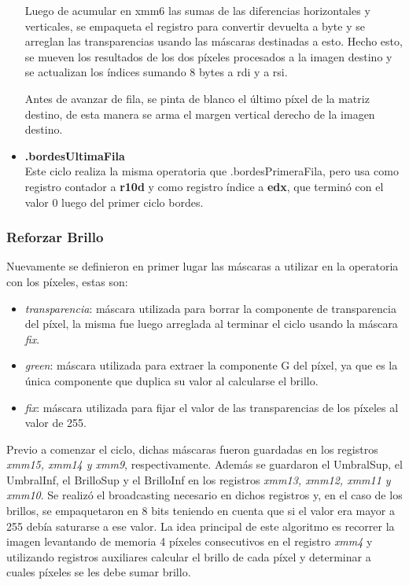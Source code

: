 \documentclass[a4paper]{article}
\begin{document}
\begin{itemize}
	Luego de acumular en xmm6 las sumas de las diferencias horizontales y verticales, se empaqueta el registro para convertir devuelta a byte y se arreglan las transparencias usando las máscaras destinadas a esto. Hecho esto, se mueven los resultados de los dos píxeles procesados a la imagen destino y se actualizan los índices sumando 8 bytes a rdi y a rsi.
	
	Antes de avanzar de fila, se pinta de blanco el último píxel de la matriz destino, de esta manera se arma el margen vertical derecho de la imagen destino.
	\item \textbf{.bordesUltimaFila}\\
	Este ciclo realiza la misma operatoria que .bordesPrimeraFila, pero usa como registro contador a \textbf{r10d} y como registro índice a \textbf{edx}, que terminó con el valor 0 luego del primer ciclo bordes.
\end{itemize}
	



   
\subsubsection{Reforzar Brillo}

\justify
Nuevamente se definieron en primer lugar las máscaras a utilizar en la operatoria con los píxeles, estas son:
\begin{itemize}
	\item \textit{transparencia}: máscara utilizada para borrar la componente de transparencia del píxel, la misma fue luego arreglada al terminar el ciclo usando la máscara \textit{fix}.
	\item \textit{green}: máscara utilizada para extraer la componente G del píxel, ya que es la única componente que duplica su valor al calcularse el brillo.
	\item \textit{fix}: máscara utilizada para fijar el valor de las transparencias de los píxeles al valor de 255.
\end{itemize} 
\justify
Previo a comenzar el ciclo, dichas máscaras fueron guardadas en los registros \textit{xmm15, xmm14 y xmm9}, respectivamente. Además se guardaron el UmbralSup, el UmbralInf, el BrilloSup y el BrilloInf en los registros \textit{xmm13, xmm12, xmm11 y xmm10}. Se realizó el broadcasting necesario en dichos registros y, en el caso de los brillos, se empaquetaron en 8 bits teniendo en cuenta que si el valor era mayor a 255 debía saturarse a ese valor.
\justify
La idea principal de este algoritmo es recorrer la imagen levantando de memoria 4 píxeles consecutivos en el registro \textit{xmm4} y utilizando registros auxiliares calcular el brillo de cada píxel y determinar a cuales píxeles se les debe sumar brillo.
 
\end{document}
